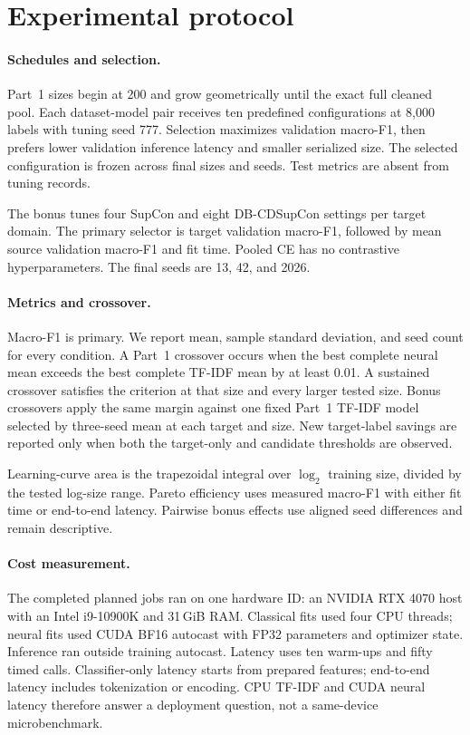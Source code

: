 \section{Experimental protocol}

\paragraph{Schedules and selection.}
Part~1 sizes begin at 200 and grow geometrically until the exact full cleaned pool. Each dataset-model pair receives ten predefined configurations at 8,000 labels with tuning seed 777. Selection maximizes validation macro-F1, then prefers lower validation inference latency and smaller serialized size. The selected configuration is frozen across final sizes and seeds. Test metrics are absent from tuning records.

The bonus tunes four SupCon and eight DB-CDSupCon settings per target domain. The primary selector is target validation macro-F1, followed by mean source validation macro-F1 and fit time. Pooled CE has no contrastive hyperparameters. The final seeds are 13, 42, and 2026.

\paragraph{Metrics and crossover.}
Macro-F1 is primary. We report mean, sample standard deviation, and seed count for every condition. A Part~1 crossover occurs when the best complete neural mean exceeds the best complete TF-IDF mean by at least 0.01. A sustained crossover satisfies the criterion at that size and every larger tested size. Bonus crossovers apply the same margin against one fixed Part~1 TF-IDF model selected by three-seed mean at each target and size. New target-label savings are reported only when both the target-only and candidate thresholds are observed.

Learning-curve area is the trapezoidal integral over $\log_2$ training size, divided by the tested log-size range. Pareto efficiency uses measured macro-F1 with either fit time or end-to-end latency. Pairwise bonus effects use aligned seed differences and remain descriptive.

\paragraph{Cost measurement.}
The completed  planned jobs ran on one hardware ID: an NVIDIA RTX 4070 host with an Intel i9-10900K and 31\,GiB RAM. Classical fits used four CPU threads; neural fits used CUDA BF16 autocast with FP32 parameters and optimizer state. Inference ran outside training autocast. Latency uses ten warm-ups and fifty timed calls. Classifier-only latency starts from prepared features; end-to-end latency includes tokenization or encoding. CPU TF-IDF and CUDA neural latency therefore answer a deployment question, not a same-device microbenchmark.


